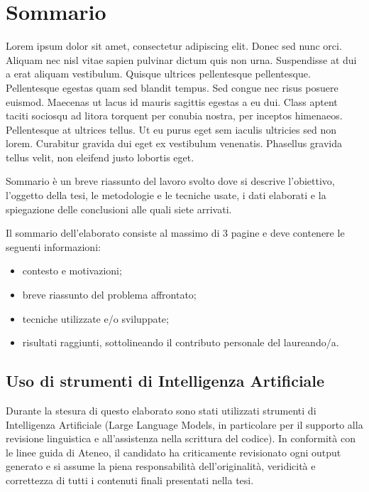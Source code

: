 \chapter*{Sommario}
\label{cha:sommario}

Lorem ipsum dolor sit amet, consectetur adipiscing elit. Donec sed nunc orci. Aliquam nec nisl vitae sapien pulvinar dictum quis non urna. Suspendisse at dui a erat aliquam vestibulum. Quisque ultrices pellentesque pellentesque. Pellentesque egestas quam sed blandit tempus. Sed congue nec risus posuere euismod. Maecenas ut lacus id mauris sagittis egestas a eu dui. Class aptent taciti sociosqu ad litora torquent per conubia nostra, per inceptos himenaeos. Pellentesque at ultrices tellus. Ut eu purus eget sem iaculis ultricies sed non lorem. Curabitur gravida dui eget ex vestibulum venenatis. Phasellus gravida tellus velit, non eleifend justo lobortis eget.

Sommario è un breve riassunto del lavoro svolto dove si descrive l'obiettivo, l'oggetto della tesi, le metodologie e le tecniche usate, i dati elaborati e la spiegazione delle conclusioni alle quali siete arrivati.

Il sommario dell’elaborato consiste al massimo di 3 pagine e deve contenere le seguenti informazioni:
\begin{itemize}
  \item contesto e motivazioni;
  \item breve riassunto del problema affrontato;
  \item tecniche utilizzate e/o sviluppate;
  \item risultati raggiunti, sottolineando il contributo personale del laureando/a.
\end{itemize}

\vspace{1.2cm}

\section*{Uso di strumenti di Intelligenza Artificiale}

Durante la stesura di questo elaborato sono stati utilizzati strumenti di Intelligenza Artificiale (Large Language Models, in particolare per il supporto alla revisione linguistica e all'assistenza nella scrittura del codice). In conformità con le linee guida di Ateneo, il candidato ha criticamente revisionato ogni output generato e si assume la piena responsabilità dell'originalità, veridicità e correttezza di tutti i contenuti finali presentati nella tesi.